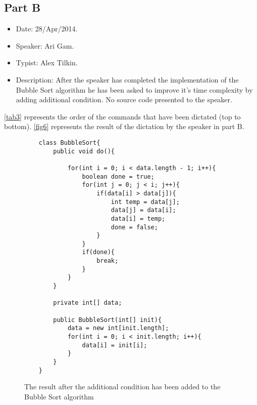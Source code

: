 \subsection{Part B}
\begin{itemize}
	\item Date: 28/Apr/2014.
	\item Speaker: Ari Gam.
	\item Typist: Alex Tilkin.
	\item Description: After the speaker has completed the implementation of the Bubble Sort algorithm he has been asked to improve it's time complexity by adding additional condition. No source code presented to the speaker.
\end{itemize}
\autoref{tab3} represents the order of the commands that have been dictated (top to bottom). \autoref{fig6} represents the result of the dictation by the speaker in part B.
\begin{figure}[H]
	\begin{lstlisting}
	class BubbleSort{
		public void do(){
			
			for(int i = 0; i < data.length - 1; i++){
				boolean done = true;
				for(int j = 0; j < i; j++){
					if(data[i] > data[j]){
						int temp = data[j];
						data[j] = data[i];
						data[i] = temp;
						done = false;
					}
				}
				if(done){
					break;
				}
			}
		}
		
		private int[] data;
		
		public BubbleSort(int[] init){
			data = new int[init.length];
			for(int i = 0; i < init.length; i++){
				data[i] = init[i];
			}
		}
	}
	\end{lstlisting}
	\caption{The result after the additional condition has been  added to the Bubble Sort algorithm}
	\label{fig6}
\end{figure}
